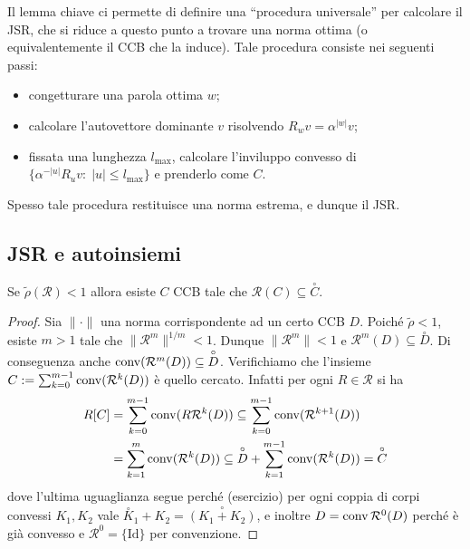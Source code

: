 Il lemma chiave ci permette di definire una ``procedura universale'' per calcolare il JSR, che si riduce a questo punto a trovare una norma ottima (o equivalentemente il CCB che la induce). Tale procedura consiste nei seguenti passi: 
\begin{itemize}
	\item congetturare una parola ottima $w$; 
	\item calcolare l'autovettore dominante $v$ risolvendo $R_{w}v = \alpha^{|w|}v$;
	\item fissata una lunghezza $l_{\max}$, calcolare l'inviluppo convesso di $\{\alpha^{-|u|}R_{u}v:\; |u|\leq l_{\max}\}$ e prenderlo come $C$.
\end{itemize}
Spesso tale procedura restituisce una norma estrema, e dunque il JSR.

\begin{esempio}
\end{esempio}



\subsection{JSR e autoinsiemi}

\begin{lemma}
	Se $\tilde\rho(\mathcal R) < 1$ allora esiste $C$ CCB tale che $\mathcal R(C) \subseteq \overset{\circ}{C}$.
\end{lemma}
\begin{proof}
	Sia $\|\cdot\|$ una norma corrispondente ad un certo CCB $D$. Poiché $\tilde\rho <1$, esiste $m>1$ tale che $\|\mathcal R^{m}\|^{1/m}<1$. Dunque $\|\mathcal R^{m}\|<1$ e $\mathcal R^{m}(D)\subseteq\overset{\circ}D$.
	Di conseguenza anche $\operatorname{conv}(\mathcal R^{m}(D))\subseteq\overset{\circ}D$. Verifichiamo che l'insieme $C:=\sum_{k=0}^{m-1}\operatorname{conv}(\mathcal R^{k}(D))$ è quello cercato.
	Infatti per ogni $R\in \mathcal R$ si ha 
	\begin{align*}
		R[C] &= 
		\sum_{k=0}^{m-1}\operatorname{conv}(R\mathcal R^{k}(D)) \subseteq
		\sum_{k=0}^{m-1}\operatorname{conv}(\mathcal R^{k+1}(D)) \\&=
		\sum_{k=1}^{m}\operatorname{conv}(\mathcal R^{k}(D)) \subseteq
		\overset{\circ}D + \sum_{k=1}^{m-1}\operatorname{conv}(\mathcal R^{k}(D)) = 
		\overset{\circ} C
	\end{align*}
	dove l'ultima uguaglianza segue perché (esercizio) per ogni coppia di corpi convessi $K_{1}, K_{2}$ vale $\overset{\circ}K_{1} + K_{2} = \overset{\circ}{(K_{1} + K_{2})}$, e inoltre $D = \operatorname{conv}\mathcal R^{0}(D)$ perché è già convesso e $\mathcal R^{0} = \{\text{Id}\}$ per convenzione.
\end{proof}

